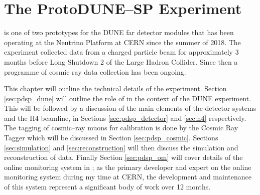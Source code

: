 \chapter{\label{ch:protodune}The ProtoDUNE--SP Experiment} 

%
% 

\minitoc

\protodune{} is one of two prototypes for the DUNE far detector modules that has
been operating at the Neutrino Platform at CERN since the summer of 2018. The
experiment collected data from a charged particle beam for approximately 3 
months before Long Shutdown 2 of the Large Hadron Collider. Since then a 
programme of cosmic ray data collection has been ongoing.

This chapter will outline the technical details of the \protodune{} experiment.
Section \ref{sec:pdsp_dune} will outline the role of \protodune{} in the context
of the DUNE experiment. This will be followed by a discussion of the main
elements of the \protodune{} detector systems and the H4 beamline, in Sections 
\ref{sec:pdsp_detector} and \ref{sec:h4} respectively.  The tagging of 
cosmic--ray muons for calibration is done by the Cosmic Ray Tagger which will 
be discussed in Section \ref{sec:pdsp_cosmic}. Sections \ref{sec:simulation} 
and \ref{sec:reconstruction} will then discuss the simulation and 
reconstruction of \protodune{} data. Finally Section \ref{sec:pdsp_om} will 
cover details of the online monitoring system in \protodune{}; as the primary 
developer and expert on the \protodune{} online monitoring system during my 
time at CERN, the development and maintenance of this system represent a 
significant body of work over 12 months.  

